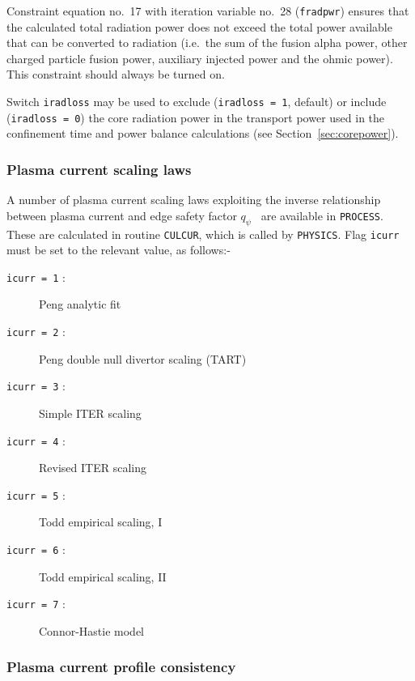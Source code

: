 \documentclass[11pt,a4paper]{report}
\newcommand{\process}{\mbox{\texttt{PROCESS}}}
\begin{document}


Constraint equation no.~17 with iteration variable no.~28 (\texttt{fradpwr})
ensures that the calculated total radiation power does not exceed the total
power available that can be converted to radiation (i.e.\ the sum of the fusion
alpha power, other charged particle fusion power, auxiliary injected power and
the ohmic power). This constraint should always be turned on.

Switch \texttt{iradloss} may be used to exclude (\texttt{iradloss = 1},
default) or include (\texttt{iradloss = 0}) the core radiation power in the
transport power used in the confinement time and power balance calculations
(see Section~\ref{sec:corepower}).

\subsubsection{Plasma current scaling laws}
\label{sec:current_scaling}

A number of plasma current scaling laws exploiting the inverse relationship
between plasma current and edge safety factor $q_{\psi}$~\cite{172} are
available in \process. These are calculated in routine \texttt{CULCUR}, which
is called by \texttt{PHYSICS}.  Flag \texttt{icurr} must be set to the
relevant value, as follows:-
\begin{description}
\item [\texttt{icurr = 1} :] Peng analytic fit
\item [\texttt{icurr = 2} :] Peng double null divertor scaling (TART)~\cite{storac}
\item [\texttt{icurr = 3} :] Simple ITER scaling
\item [\texttt{icurr = 4} :] Revised ITER scaling~\cite{Uckan88}
\item [\texttt{icurr = 5} :] Todd empirical scaling, I
\item [\texttt{icurr = 6} :] Todd empirical scaling, II
\item [\texttt{icurr = 7} :] Connor-Hastie model
\end{description}

\subsubsection{Plasma current profile consistency}
\label{sec:current_profile}
\end{document}
